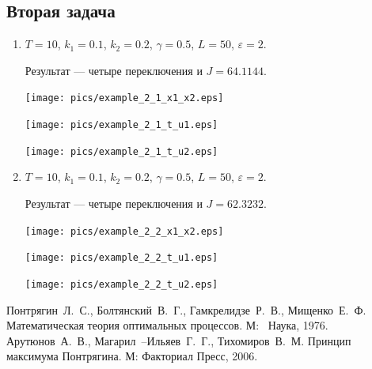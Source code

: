 \documentclass[11pt]{article}
\begin{document}
\subsection{Вторая задача}
\begin{enumerate}
\item
$T = 10$, $k_1 = 0.1$, $k_2 = 0.2$, $\gamma = 0.5$, $L = 50$, $\varepsilon = 2$.

Результат --- четыре переключения и $J = 64.1144$.

\texttt{[image: pics/example\_2\_1\_x1\_x2.eps]}

\texttt{[image: pics/example\_2\_1\_t\_u1.eps]}

\texttt{[image: pics/example\_2\_1\_t\_u2.eps]}

\item
$T = 10$, $k_1 = 0.1$, $k_2 = 0.2$, $\gamma = 0.5$, $L = 50$, $\varepsilon = 2$.

Результат --- четыре переключения и $J = 62.3232$.

\texttt{[image: pics/example\_2\_2\_x1\_x2.eps]}

\texttt{[image: pics/example\_2\_2\_t\_u1.eps]}

\texttt{[image: pics/example\_2\_2\_t\_u2.eps]}

\end{enumerate}
\pagebreak
{}
\begin{thebibliography}{99}
	 Понтрягин~Л.~С., Болтянский~В.~Г., Гамкрелидзе~Р.~В., Мищенко~Е.~Ф. Математическая теория оптимальных процессов. М:~ Наука, 1976.
	 Арутюнов~А.~В., Магарил~--Ильяев~Г.~Г., Тихомиров~В.~М. Принцип максимума Понтрягина. М: Факториал Пресс, 2006.
\end{thebibliography}
\end{document}
